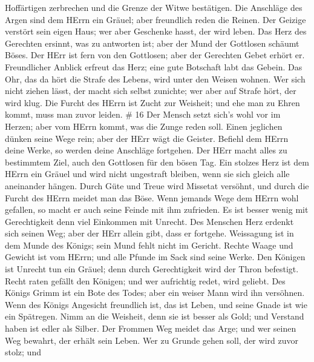 Hoffärtigen zerbrechen und die Grenze der Witwe bestätigen.
 Die Anschläge des Argen sind dem HErrn ein Gräuel; aber
freundlich reden die Reinen.  Der Geizige verstört sein
eigen Haus; wer aber Geschenke hasst, der wird leben.  Das
Herz des Gerechten ersinnt, was zu antworten ist; aber der Mund der
Gottlosen schäumt Böses.  Der HErr ist fern von den
Gottlosen; aber der Gerechten Gebet erhört er. 
Freundlicher Anblick erfreut das Herz; eine gute Botschaft labt das
Gebein.  Das Ohr, das da hört die Strafe des Lebens, wird
unter den Weisen wohnen.  Wer sich nicht ziehen lässt, der
macht sich selbst zunichte; wer aber auf Strafe hört, der wird klug.
 Die Furcht des HErrn ist Zucht zur Weisheit; und ehe man
zu Ehren kommt, muss man zuvor leiden. \# 16  Der Mensch
setzt sich's wohl vor im Herzen; aber vom HErrn kommt, was die Zunge
reden soll.  Einen jeglichen dünken seine Wege rein; aber
der HErr wägt die Geister.  Befiehl dem HErrn deine Werke,
so werden deine Anschläge fortgehen.  Der HErr macht alles
zu bestimmtem Ziel, auch den Gottlosen für den bösen Tag. 
Ein stolzes Herz ist dem HErrn ein Gräuel und wird nicht ungestraft
bleiben, wenn sie sich gleich alle aneinander hängen.  Durch
Güte und Treue wird Missetat versöhnt, und durch die Furcht des HErrn
meidet man das Böse.  Wenn jemands Wege dem HErrn wohl
gefallen, so macht er auch seine Feinde mit ihm zufrieden. 
Es ist besser wenig mit Gerechtigkeit denn viel Einkommen mit Unrecht.
 Des Menschen Herz erdenkt sich seinen Weg; aber der HErr
allein gibt, dass er fortgehe.  Weissagung ist in dem Munde
des Königs; sein Mund fehlt nicht im Gericht.  Rechte Waage
und Gewicht ist vom HErrn; und alle Pfunde im Sack sind seine Werke.
 Den Königen ist Unrecht tun ein Gräuel; denn durch
Gerechtigkeit wird der Thron befestigt.  Recht raten
gefällt den Königen; und wer aufrichtig redet, wird geliebt.
 Des Königs Grimm ist ein Bote des Todes; aber ein weiser
Mann wird ihn versöhnen.  Wenn des Königs Angesicht
freundlich ist, das ist Leben, und seine Gnade ist wie ein Spätregen.
 Nimm an die Weisheit, denn sie ist besser als Gold; und
Verstand haben ist edler als Silber.  Der Frommen Weg
meidet das Arge; und wer seinen Weg bewahrt, der erhält sein Leben.
 Wer zu Grunde gehen soll, der wird zuvor stolz; und
